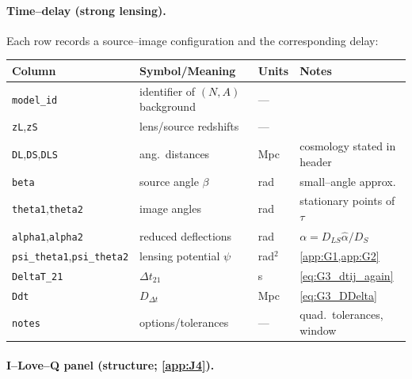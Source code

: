 \documentclass{iopjournal}
\begin{document}
\paragraph{Time--delay (strong lensing).}
Each row records a source--image configuration and the corresponding delay:
\begin{center}
\begin{tabular}{llll}
\hline
Column & Symbol/Meaning & Units & Notes \\
\hline
\texttt{model\_id} & identifier of $(N,A)$ background & --- & \\
\texttt{zL},\texttt{zS} & lens/source redshifts & --- & \\
\texttt{DL},\texttt{DS},\texttt{DLS} & ang.\ distances & Mpc & cosmology stated in header \\
\texttt{beta} & source angle $\beta$ & rad & small--angle approx. \\
\texttt{theta1},\texttt{theta2} & image angles & rad & stationary points of $\tau$ \\
\texttt{alpha1},\texttt{alpha2} & reduced deflections & rad & $\alpha=D_{LS}\hat\alpha/D_S$ \\
\texttt{psi\_theta1},\texttt{psi\_theta2} & lensing potential $\psi$ & rad$^{2}$ & \cref{app:G1,app:G2} \\
\texttt{DeltaT\_21} & $\Delta t_{21}$ & s & \eqref{eq:G3_dtij_again} \\
\texttt{Ddt} & $D_{\Delta t}$ & Mpc & \eqref{eq:G3_DDelta} \\
\texttt{notes} & options/tolerances & --- & quad.\ tolerances, window \\
\hline
\end{tabular}
\end{center}

\paragraph{I--Love--Q panel (structure; \cref{app:J4}).} \par \smallskip
\end{document}
